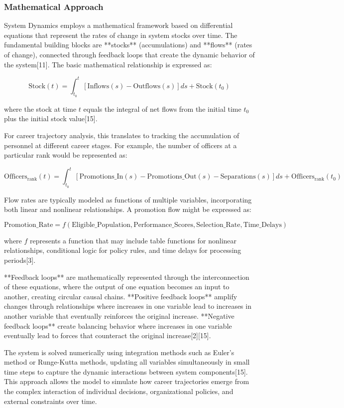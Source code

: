 \documentclass[main.tex]{subfiles}
\begin{document}
\subsubsection{Mathematical Approach}

System Dynamics employs a mathematical framework based on differential equations that represent the rates of change in system stocks over time. The fundamental building blocks are **stocks** (accumulations) and **flows** (rates of change), connected through feedback loops that create the dynamic behavior of the system[11]. The basic mathematical relationship is expressed as:

$$ \text{Stock}(t) = \int_{t_0}^{t} [\text{Inflows}(s) - \text{Outflows}(s)] ds + \text{Stock}(t_0) $$

where the stock at time $t$ equals the integral of net flows from the initial time $t_0$ plus the initial stock value[15].

For career trajectory analysis, this translates to tracking the accumulation of personnel at different career stages. For example, the number of officers at a particular rank would be represented as:

$$ \text{Officers}_{\text{rank}}(t) = \int_{t_0}^{t} [\text{Promotions\_In}(s) - \text{Promotions\_Out}(s) - \text{Separations}(s)] ds + \text{Officers}_{\text{rank}}(t_0) $$

Flow rates are typically modeled as functions of multiple variables, incorporating both linear and nonlinear relationships. A promotion flow might be expressed as:

$$ \text{Promotion\_Rate} = f(\text{Eligible\_Population}, \text{Performance\_Scores}, \text{Selection\_Rate}, \text{Time\_Delays}) $$

where $f$ represents a function that may include table functions for nonlinear relationships, conditional logic for policy rules, and time delays for processing periods[3].

**Feedback loops** are mathematically represented through the interconnection of these equations, where the output of one equation becomes an input to another, creating circular causal chains. **Positive feedback loops** amplify changes through relationships where increases in one variable lead to increases in another variable that eventually reinforces the original increase. **Negative feedback loops** create balancing behavior where increases in one variable eventually lead to forces that counteract the original increase[2][15].

The system is solved numerically using integration methods such as Euler's method or Runge-Kutta methods, updating all variables simultaneously in small time steps to capture the dynamic interactions between system components[15]. This approach allows the model to simulate how career trajectories emerge from the complex interaction of individual decisions, organizational policies, and external constraints over time.
\end{document}

